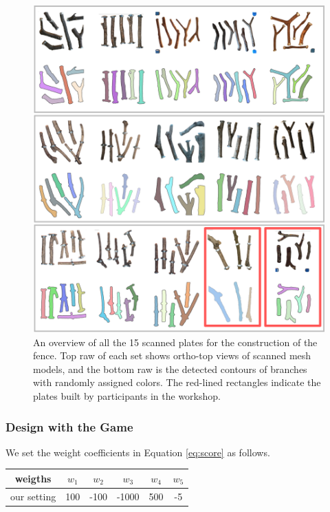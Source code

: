 \begin{figure}[ht]
  \begin{center}
    \includegraphics[width = 0.4\paperwidth]{images/fabrication/all_plates.png}
    \caption{An overview of all the 15 scanned plates for the construction of the fence. Top raw of each set shows ortho-top views of scanned mesh models, and the bottom raw is the detected contours of branches with randomly assigned colors. The red-lined rectangles indicate the plates built by participants in the workshop.}
    \label{fig:scannedplates}
  \end{center}
\end{figure}


\subsubsection*{Design with the Game}

We set the weight coefficients in Equation \ref{eq:score} as follows.
\begin{center}
	\begin{tabulary}{\columnwidth}{ |C||C|C|C|C|C| }
		\hline
		weigths & $w_1$ & $w_2$ & $w_3$ & $w_4$ & $w_5$ \\
		\hline
		our setting & 100 & -100 & -1000 & 500 & -5 \\
		\hline
	\end{tabulary}
	\label{tab:weights}
\end{center}

